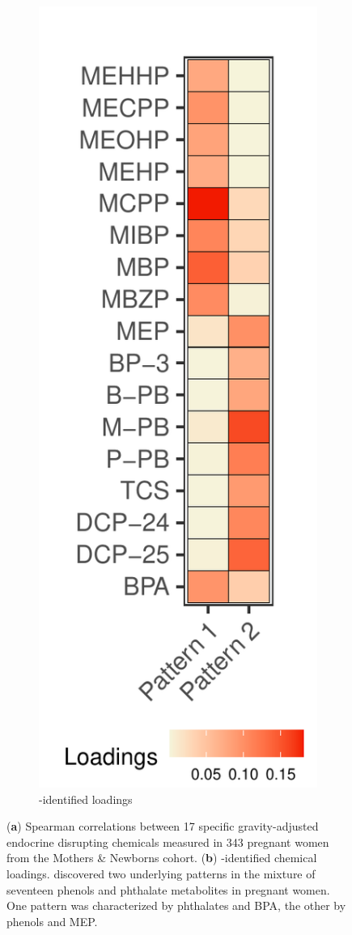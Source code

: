 \begin{landscape}
\begin{figure}
\begin{subfigure}[b]{0.3\textwidth}
\includegraphics[scale = 0.69]{./figures/eh_loadings.pdf}
\caption{\bnmfc-identified loadings}
\label{fig:load}
\end{subfigure}
\hfill
\caption[Intra-chemical correlations and \bnmfc-identified chemical loadings]{(\textbf{a}) Spearman correlations between 17 specific gravity-adjusted endocrine disrupting chemicals measured in 343 pregnant women from the Mothers \& Newborns cohort. (\textbf{b}) \bnmfc-identified chemical loadings. \bnmf discovered two underlying patterns in the mixture of seventeen phenols and phthalate metabolites in pregnant women. One pattern was characterized by phthalates and BPA, the other by phenols and MEP.}
\end{figure}
\end{landscape}
\clearpage

